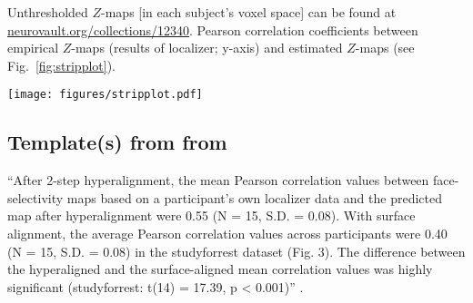 



Unthresholded $Z$-maps [in each subject's voxel space] can be found at
\href{https://identifiers.org/neurovault.collection:12340}{\url{neurovault.org/collections/12340}}.
%
Pearson correlation coefficients between empirical $Z$-maps (results of
localizer; y-axis) and estimated $Z$-maps (see Fig.~\ref{fig:stripplot}).



\begin{figure*}[tbp] \centering
    \texttt{[image: figures/stripplot.pdf]} \caption{
    \textbf{Correlations between empirical and predicted
    \textit{\textbf{Z}}-maps.}
    Grey dots: A left-out subject's $Z$-map was estimated by projecting all
    other subjects ($N = 13$) $Z$-maps through the MNI152 space into the
    left-out subject space and averaging values across subject; correlations
    between empirical values from the localizer \& the predicted values using
    anatomical alignment.
    Green dots: estimation from visual localizer.
    Blue dots: transformation matrices computed based on an increasing number of
    segments of the audio-description; correlations between empirical values \&
    the predicted values using parts of the audio-description.
    Red dots: transformation matrices computed based on an increasing number of
    segments of the movie; correlations between empirical values \& the
    predicted values using parts of the movie.
}
\label{fig:stripplot}
\end{figure*}


\subsection{Template(s) from from \citet{jiahui2020predicting}}

%
``After 2-step hyperalignment, the mean Pearson correlation values between
face-selectivity maps based on a participant's own localizer data and the
predicted map after hyperalignment were 0.55 (N = 15, S.D. = 0.08).
%
With surface alignment, the average Pearson correlation values across
participants were 0.40 (N = 15, S.D. = 0.08) in the studyforrest dataset (Fig.
3).
%
The difference between the hyperaligned and the surface-aligned mean correlation
values was highly significant (studyforrest: t(14) = 17.39, p < 0.001)''
\citep{jiahui2020predicting}.



